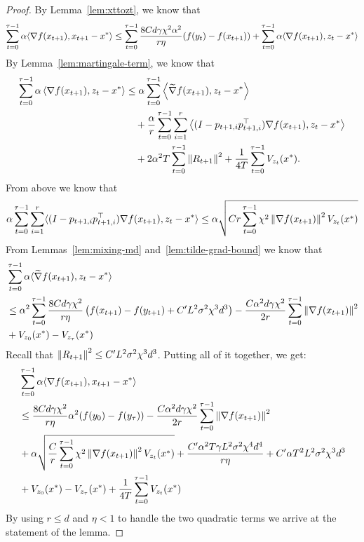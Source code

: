 \begin{proof}
    By Lemma~\ref{lem:xttozt}, we know that
    \begin{align*}
        \sum_{t=0}^{\tau-1} \alpha \langle \nabla f(x_{t+1}), x_{t+1}-x^* \rangle \leq \sum_{t=0}^{\tau-1} \frac{8Cd \gamma \chi^2\alpha^2}{r\eta} (f(y_t) - f(x_{t+1})) + \sum_{t=0}^{\tau-1} \alpha \langle \nabla f(x_{t+1}), z_t - x^* \rangle
    \end{align*}
    By Lemma~\ref{lem:martingale-term}, we know that
    \begin{align*}
    \sum_{t=0}^{\tau-1}
    \alpha
    \left\langle
        \nabla f(x_{t+1}), z_t-x^*
    \right\rangle &\leq
    \alpha\sum_{t=0}^{\tau-1}
    \left\langle
        \widetilde{\nabla} f(x_{t+1}), z_t-x^*
    \right\rangle
    \\
    &\quad
    +\frac{\alpha}{r}
    \sum_{t=0}^{\tau-1}\sum_{i=1}^r
    \left\langle
        (I-p_{t+1,i}p_{t+1,i}^{\top})
        \nabla f(x_{t+1}),
        z_t-x^*
    \right\rangle
    \\
    &\quad
    +2\alpha^2 T\sum_{t=0}^{\tau-1}\left\lVert R_{t+1} \right\rVert^2
    +\frac{1}{4T}
    \sum_{t=0}^{\tau-1}V_{z_t}(x^*).
\end{align*}
    From above we know that
    \begin{align*}
        \alpha\sum_{t=0}^{\tau-1} \sum_{i=1}^r \langle (I- p_{t+1,i}p_{t+1,i}^\top) \nabla f(x_{t+1}), z_t - x^*\rangle \leq \alpha \sqrt{Cr \sum_{t=0}^{\tau-1} \chi^2 \left\lVert \nabla f(x_{t+1}) \right\rVert^2 V_{z_t}(x^*)}
    \end{align*}
    From Lemmas~\ref{lem:mixing-md} and~\ref{lem:tilde-grad-bound} we know that 
    \begin{align*}
        &\sum_{t=0}^{\tau-1} \alpha \langle \widetilde{\nabla} f(x_{t+1}), z_t - x^*\rangle
        \\&\leq \alpha^2\sum_{t=0}^{\tau-1} \frac{8Cd \gamma \chi^2}{r \eta} \left(f(x_{t+1}) - f(y_{t+1}) + C'L^2 \sigma^2 \chi^3 d^3\right) - \frac{C\alpha^2d\gamma \chi^2}{2r} \sum_{t=0}^{\tau-1} \left\lVert \nabla f(x_{t+1}) \right\rVert^2 \\
        &+ V_{z_0}(x^*) - V_{z_\tau}(x^*)
    \end{align*}
    Recall that $\left\lVert R_{t+1} \right\rVert^2 \leq C'L^2\sigma^2 \chi^3 d^3$. Putting all of it together, we get:
    \begin{align*}
        &\sum_{t=0}^{\tau-1} \alpha \langle \nabla f(x_{t+1}), x_{t+1}-x^* \rangle
        \\&\leq \frac{8Cd \gamma \chi^2}{r \eta} \alpha^2(f(y_0) - f(y_\tau)) -\frac{C\alpha^2d\gamma \chi^2}{2r} \sum_{t=0}^{\tau-1} \left\lVert \nabla f(x_{t+1}) \right\rVert^2  \\
        &+\alpha \sqrt{ \frac C r \sum_{t=0}^{\tau-1} \chi^2 \left\lVert \nabla f(x_{t+1}) \right\rVert^2 V_{z_t}(x^*)} + \frac{C'\alpha^2 T \gamma L^2 \sigma^2 \chi^4 d^4}{r\eta} + C' \alpha T^2 L^2\sigma^2 \chi^3 d^3  \\
        &+ V_{z_0}(x^*) - V_{z_\tau}(x^*) + \frac{1}{4T} \sum_{t=0}^{\tau-1} V_{z_t}(x^*)
    \end{align*}
    By using $r \leq d$ and $\eta < 1$ to handle the two quadratic terms we arrive at the statement of the lemma.
\end{proof}

